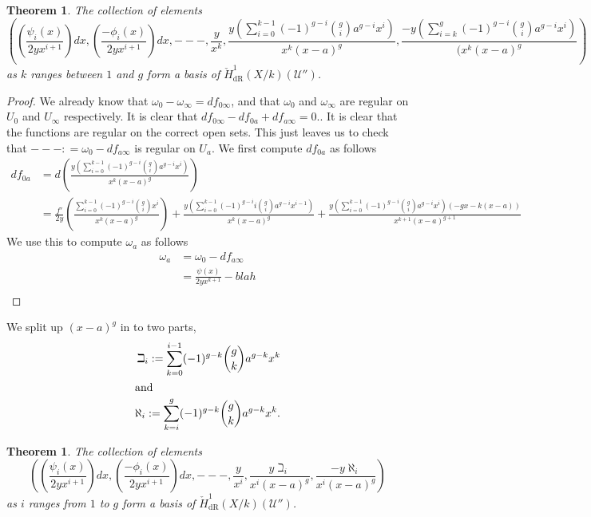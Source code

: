 \documentclass[draft, 11pt]{article} %
\theoremstyle{plain}
\newtheorem{thm}[defn]{Theorem}
\theoremstyle{remark}
\newcommand{\cU}{{\mathcal U}}
\newcommand{\cechderhamhone}{\check{H}_{\text {dR}}^1(X/k)}
\begin{document}
\begin{thm}
The collection of elements
\begin{equation}
\left( \left( \frac{\psi_i(x)}{2yx^{i+1}}\right) dx,  \left(\frac{-\phi_i(x)}{2yx^{i+1}}\right) dx, ---, \frac{y}{x^k}, \frac{y\left( \sum_{i=0}^{k-1} (-1)^{g-i} \binom{g}{i}a^{g-i}x^i \right)}{x^k(x-a)^g}, \frac{-y\left( \sum_{i=k}^g (-1)^{g-i} \binom{g}{i} a^{g-i}x^i \right)}{(x^k(x-a)^g} \right)
\end{equation}
as $k$ ranges between $1$ and $g$ form a basis of $\cechderhamhone(\cU'')$.
\end{thm}
\begin{proof}
We already know that $\omega_{0} - \omega_{\infty} = df_{0 \infty}$, and that $\omega_0$ and $\omega_\infty$ are regular on $U_0$ and $U_\infty$ respectively.
It is clear that $df_{0\infty} - df_{0 a} + df_{a \infty} = 0$..
It is clear that the functions are regular on the correct open sets. 
This just leaves us to check that $--- : = \omega_{0} - df_{a \infty}$ is regular on $U_a$.
We first compute $df_{0 a }$ as follows
\begin{align}
df_{0 a} & = d \left( \frac{y\left( \sum_{i=0}^{k-1}(-1)^{g-i}\binom{g}{i}a^{g-i}x^i \right)}{x^k(x-a)^g} \right) \\
& = \frac{f'}{2y} \left( \frac{\sum_{i=0}^{k-1}(-1)^{g-i}\binom{g}{i}x^i}{x^k(x-a)^g}\right) + \frac{ y \left( \sum_{i=0}^{k-1}(-1)^{g-i}i \binom{g}{i}a^{g-i}x^{i-1}\right)}{x^k(x-a)^g} + \frac{y\left(\sum_{i=0}^{k-1}(-1)^{g-i}\binom{g}{i}a^{g-i}x^i\right)(-gx-k(x-a))}{x^{k+1}(x-a)^{g+1}} 
\end{align}
We use this to compute $\omega_a$ as follows
\begin{align}
\omega_a & = \omega_0 - df_{a \infty}\\
& = \frac{\psi(x)}{2yx^{k+1}} - blah\\
\end{align}
\end{proof}
We split up $(x-a)^g$ in to two parts, 
\begin{align}
\beth_i := \sum_{k=0}^{i-1} (-1)^{g-k} \binom{g}{k} a^{g-k}x^k \\
\intertext{and}
\aleph_i := \sum_{k=i}^g (-1)^{g-k} \binom{g}{k} a^{g-k}x^k.
\end{align}
\begin{thm}
The collection of elements 
\begin{equation}
\left( \left( \frac{\psi_i(x)}{2yx^{i+1}} \right)dx, \left( \frac{-\phi_i(x)}{2yx^{i+1}} \right) dx, ---, \frac{y}{x^i}, \frac{y\beth_i}{x^i(x-a)^g}, \frac{-y\aleph_i}{x^i(x-a)^g} \right)
\end{equation}
as $i$ ranges from $1$ to $g$ form a basis of $\cechderhamhone(\cU'')$.
\end{thm}
\end{document}
